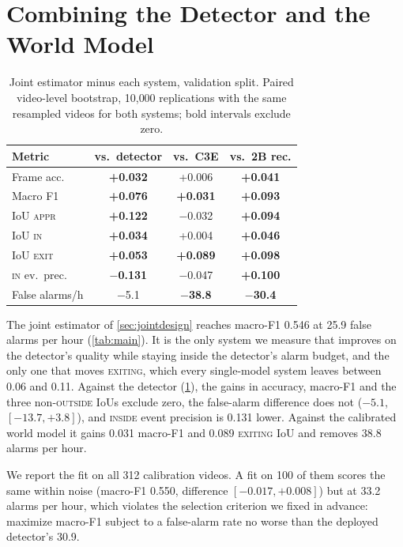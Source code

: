 \documentclass[journal]{IEEEtran}
\begin{document}
\section{Combining the Detector and the World Model}
\label{sec:joint}

\begin{table}[t]
\centering
\caption{Joint estimator minus each system, validation split.  Paired video-level bootstrap, 10{,}000 replications with the same resampled videos for both systems; bold intervals exclude zero.}
\label{tab:ci}
\footnotesize
\setlength{\tabcolsep}{3pt}
\begin{tabular}{@{}lccc@{}}
\toprule
Metric & vs.\ detector & vs.\ C3E & vs.\ 2B rec. \\
\midrule
Frame acc.     & \textbf{+0.032} & +0.006 & \textbf{+0.041} \\
Macro F1       & \textbf{+0.076} & \textbf{+0.031} & \textbf{+0.093} \\
IoU \textsc{appr}  & \textbf{+0.122} & $-$0.032 & \textbf{+0.094} \\
IoU \textsc{in}    & \textbf{+0.034} & +0.004 & \textbf{+0.046} \\
IoU \textsc{exit}  & \textbf{+0.053} & \textbf{+0.089} & \textbf{+0.098} \\
\textsc{in} ev.\ prec.  & \textbf{$-$0.131} & $-$0.047 & \textbf{+0.100} \\
False alarms/h & $-$5.1 & \textbf{$-$38.8} & \textbf{$-$30.4} \\
\bottomrule
\end{tabular}
\end{table}

The joint estimator of \cref{sec:jointdesign} reaches macro-F1 0.546 at 25.9 false alarms per hour (\cref{tab:main}).  It is the only system we measure that improves on the detector's quality while staying inside the detector's alarm budget, and the only one that moves \textsc{exiting}, which every single-model system leaves between 0.06 and 0.11.  Against the detector (\cref{tab:ci}), the gains in accuracy, macro-F1 and the three non-\textsc{outside} IoUs exclude zero, the false-alarm difference does not ($-5.1$, $[-13.7,+3.8]$), and \textsc{inside} event precision is 0.131 lower.  Against the calibrated world model it gains 0.031 macro-F1 and 0.089 \textsc{exiting} IoU and removes 38.8 alarms per hour.

We report the fit on all 312 calibration videos.  A fit on 100 of them scores the same within noise (macro-F1 0.550, difference $[-0.017,+0.008]$) but at 33.2 alarms per hour, which violates the selection criterion we fixed in advance: maximize macro-F1 subject to a false-alarm rate no worse than the deployed detector's 30.9.
\end{document}
